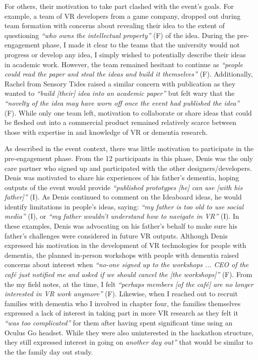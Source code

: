 For others, their motivation to take part clashed with the event's goals. For example, a team of VR developers from a game company, dropped out during team formation with concerns about revealing their idea to the extent of questioning \textit{``who owns the intellectual property''} (F) of the idea. During the pre-engagement phase, I made it clear to the teams that the university would not progress or develop any idea, I simply wished to potentially describe their ideas in academic work. However, the team remained hesitant to continue as \textit{``people could read the paper and steal the ideas and build it themselves''} (F).  Additionally, Rachel from Sensory Tides raised a similar concern with publication as they wanted to \textit{``build [their] idea into an academic paper''} but felt wary that the \textit{``novelty of the idea may have worn off once the event had published the idea''} (F). While only one team left, motivation to collaborate or share ideas that could be fleshed out into a commercial product remained relatively scarce between those with expertise in and knowledge of VR or dementia research. 

As described in the event context, there was little motivation to participate in the pre-engagement phase. From the 12 participants in this phase, Denis was the only care partner who signed up and participated with the other designers/developers. Denis was motivated to share his experiences of his father’s dementia, hoping outputs of the event would provide \textit{``published prototypes [he] can use [with his father]''} (I). As Denis continued to comment on the Ideaboard ideas, he would identify limitations in people’s ideas, saying: \textit{``my father is too old to use social media''} (I), or \textit{``my father wouldn’t understand how to navigate in VR''} (I). In these examples, Denis was advocating on his father's behalf to make sure his father’s challenges were considered in future VR outputs. Although Denis expressed his motivation in the development of VR technologies for people with dementia, the planned in-person workshops with people with dementia raised concerns about interest when \textit{``no-one signed up to the workshops ... CEO of the café just notified me and asked if we should cancel the [the workshops]''} (F). From the my field notes, at the time, I felt \textit{``perhaps members [of the café] are no longer interested in VR work anymore''} (F). Likewise, when I reached out to recruit families with dementia who I involved in chapter four, the families themselves expressed a lack of interest in taking part in more VR research as they felt it \textit{``was too complicated''} for them after having spent significant time using an Oculus Go headset. While they were also uninterested in the hackathon structure, they still expressed interest in going on \textit{another day out''} that would be similar to the the family day out study.


